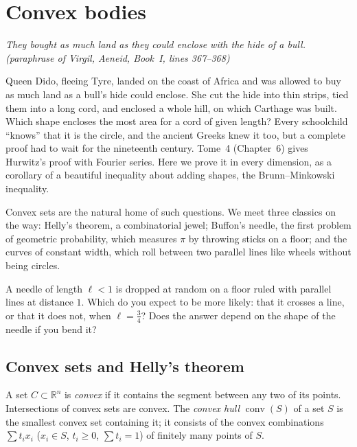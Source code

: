 \chapter{Convex bodies}\label{ch:convex}

\begin{center}\itshape
They bought as much land as they could enclose with the hide of a bull.
\upshape(paraphrase of Virgil, \emph{Aeneid}, Book~I, lines 367--368)
\end{center}

Queen Dido, fleeing Tyre, landed on the coast of Africa and was allowed to buy as much land as a bull's hide could enclose. She cut the hide into thin strips,
tied them into a long cord, and enclosed a whole hill, on which Carthage was built. Which shape encloses the most area for a cord of given length? Every
schoolchild ``knows'' that it is the circle, and the ancient Greeks knew it too, but a complete proof had to wait for the nineteenth century. Tome~4
(Chapter~6) gives Hurwitz's proof with Fourier series. Here we prove it in every dimension, as a corollary of a beautiful inequality about adding
shapes, the Brunn--Minkowski inequality.

Convex sets are the natural home of such questions. We meet three classics on the way: Helly's theorem, a combinatorial jewel; Buffon's needle, the
first problem of geometric probability, which measures $\pi$ by throwing sticks on a floor; and the curves of constant width, which roll between two parallel
lines like wheels without being circles.

\begin{think}
A needle of length $\ell<1$ is dropped at random on a floor ruled with parallel lines at distance $1$. Which do you expect to be more likely: that it
crosses a line, or that it does not, when $\ell=\frac34$? Does the answer depend on the shape of the needle if you bend it?
\end{think}

\section{Convex sets and Helly's theorem}

A set $C\subset\mathbb R^n$ is \emph{convex} if it contains the segment between any two of its points. Intersections of convex sets are convex. The
\emph{convex hull} $\operatorname{conv}(S)$ of a set $S$ is the smallest convex set containing it; it consists of the convex combinations
$\sum t_ix_i$ ($x_i\in S$, $t_i\ge0$, $\sum t_i=1$) of finitely many points of $S$.

